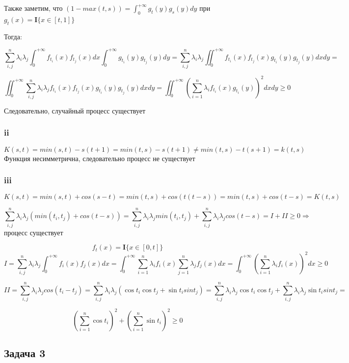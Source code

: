 \documentclass[a4paper,12pt]{article}
\def \mbf{\mathbf}
\def \I{\mbf{I}}
\begin{document}
Также заметим, что $ (1-max(t,s)) = \int_{0}^{+\infty} g_t(y) g_s(y) dy $ при  $ g_t(x) = \I\{ x \in [t, 1] \} $

Тогда:

\[ \sum_{i,j}^{n} \lambda_i \lambda_j \int_{0}^{+\infty} f_{t_i}(x) f_{t_j}(x) dx \int_{0}^{+\infty} g_{t_i}(y) g_{t_j}(y) dy = \sum_{i,j}^{n} \lambda_i \lambda_j \iint_{0}^{+\infty} f_{t_i}(x) f_{t_j}(x)  g_{t_i}(y) g_{t_j}(y) dx dy  =  \]

\[  \iint_{0}^{+\infty} \sum_{i,j}^{n} \lambda_i \lambda_j  f_{t_i}(x) f_{t_j}(x)  g_{t_i}(y) g_{t_j}(y) dx dy =  \iint_{0}^{+\infty} \left(\sum_{i = 1}^{n} \lambda_i  f_{t_i}(x)   g_{t_i}(y) \right)^2 dx dy \ge 0 \]

Следовательно, случайный процесс существует

\subsubsection{ii}
\[ K(s,t) = min(s,t) - s(t+1) = min(t,s) - s(t+1) \neq min(t,s) - t(s+1)  = k(t,s) \]
Функция несимметрична, следовательно процесс не существует
\subsubsection{iii}

\[ K(s,t) = min(s,t) + cos(s-t) = min(t,s) + cos(t(t-s)) = min(t,s) + cos(t-s) = K(t,s) \]

\[ \sum_{i,j}^{n} \lambda_i\lambda_j (min(t_i, t_j) + cos(t-s)) = \sum_{i,j}^{n} \lambda_i\lambda_j min(t_i, t_j) + \sum_{i,j}^{n} \lambda_i\lambda_j cos(t-s) = I + II  \ge 0 \Rightarrow \] процесс существует

\[   f_t(x) = \I\{ x \in [0,t] \} \]
\[ I =  \sum_{i,j}^{n} \lambda_i\lambda_j \int_{0}^{+\infty} f_i(x)f_j(x)dx =  \int_{0}^{+\infty} \sum_{i= 1}^{n} \lambda_i f_i(x) \sum_{j = 1}^{n} \lambda_j f_j(x) dx = \int_{0}^{+\infty} (\sum_{i = 1}^{n} \lambda_i f_i(x))^2 dx  \ge 0 \]

\[ II = \sum_{i,j}^{n} \lambda_i \lambda_j cos(t_i - t_j)  =  \sum_{i,j}^{n} \lambda_i \lambda_j (\cos t_i \cos t_j + \sin t_i sin t_j) = \sum_{i,j}^{n} \lambda_i \lambda_j \cos t_i \cos t_j + \sum_{i,j}^{n} \lambda_i \lambda_j  \sin t_i sin t_j = \]

\[ (\sum_{i = 1}^{n} \cos t_i)^2 +  (\sum_{i = 1}^{n} \sin t_i)^2 \ge 0 \]


\subsection{Задача 3}
\end{document}
